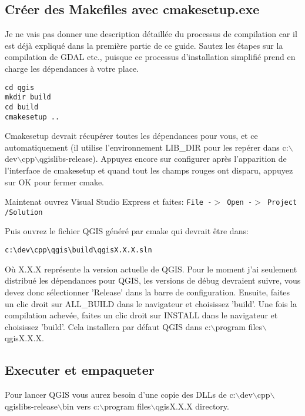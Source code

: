 \subsection{Créer des Makefiles avec cmakesetup.exe}
Je ne vais pas donner une description détaillée du processus de compilation car il est déjà expliqué dans la première partie de ce guide. Sautez les étapes sur la compilation de GDAL etc., puisque ce processus d'installation simplifié prend en charge les dépendances à votre place.

\begin{verbatim}
cd qgis
mkdir build
cd build
cmakesetup ..
\end{verbatim}

Cmakesetup devrait récupérer toutes les dépendances pour vous, et ce automatiquement (il utilise l'environnement LIB\_DIR pour les repérer dans c:$\backslash$dev$\backslash$cpp$\backslash$qgislibs-release). 
Appuyez encore sur configurer après l'apparition de l'interface de cmakesetup et quand tout les champs rouges ont disparu, appuyez sur OK pour fermer cmake.

Maintenat ouvrez Visual Studio Express et faites: \texttt{File -$>$ Open -$>$ Project /Solution}

Puis ouvrez le fichier QGIS généré par cmake qui devrait être dans:

\begin{verbatim}
c:\dev\cpp\qgis\build\qgisX.X.X.sln
\end{verbatim}

Où X.X.X représente la version actuelle de QGIS. Pour le moment j'ai seulement distribué les dépendances pour QGIS, les versions de débug devraient suivre, vous devez donc sélectionner 'Release' dans la barre de configuration. Ensuite, faites un clic droit sur ALL\_BUILD dans le navigateur et choisissez 'build'. Une fois la compilation achevée, faites un clic droit sur INSTALL dans le navigateur et choisissez 'build'. Cela installera par défaut QGIS dans c:$\backslash$program files$\backslash$qgisX.X.X.

\subsection{Executer et empaqueter}
Pour lancer QGIS vous aurez besoin d'une copie des DLLs de c:$\backslash$dev$\backslash$cpp$\backslash$qgislibs-release$\backslash$bin vers c:$\backslash$program files$\backslash$qgisX.X.X directory.